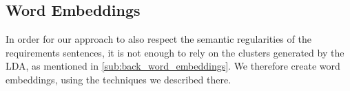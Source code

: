 \subsection{Word Embeddings}
In order for our approach to also respect the semantic regularities of the requirements sentences, it is not enough to rely on the clusters generated by the LDA, as mentioned in \autoref{sub:back_word_embeddings}. We therefore create word embeddings, using the techniques we described there.


